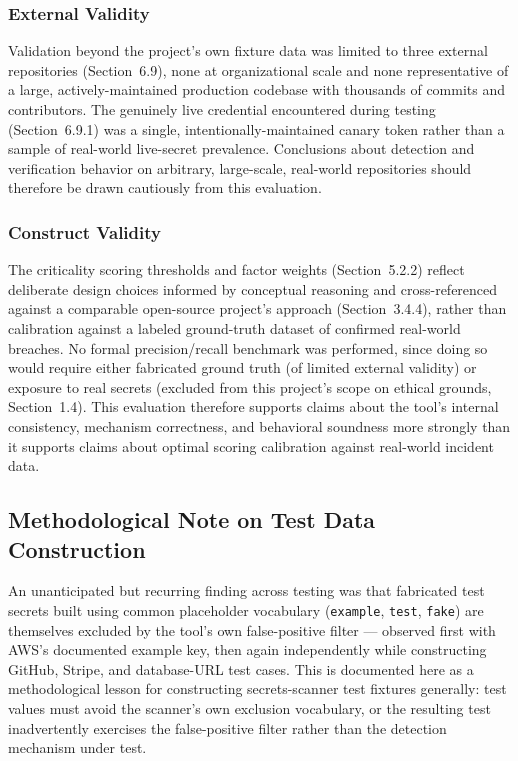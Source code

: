 \documentclass[12pt]{article}
\begin{document}
\subsubsection*{External Validity}

Validation beyond the project's own fixture data was limited to three external repositories (Section~6.9), none at organizational scale and none representative of a large, actively-maintained production codebase with thousands of commits and contributors. The genuinely live credential encountered during testing (Section~6.9.1) was a single, intentionally-maintained canary token rather than a sample of real-world live-secret prevalence. Conclusions about detection and verification behavior on arbitrary, large-scale, real-world repositories should therefore be drawn cautiously from this evaluation.

\subsubsection*{Construct Validity}

The criticality scoring thresholds and factor weights (Section~5.2.2) reflect deliberate design choices informed by conceptual reasoning and cross-referenced against a comparable open-source project's approach (Section~3.4.4), rather than calibration against a labeled ground-truth dataset of confirmed real-world breaches. No formal precision/recall benchmark was performed, since doing so would require either fabricated ground truth (of limited external validity) or exposure to real secrets (excluded from this project's scope on ethical grounds, Section~1.4). This evaluation therefore supports claims about the tool's internal consistency, mechanism correctness, and behavioral soundness more strongly than it supports claims about optimal scoring calibration against real-world incident data.

\subsection{Methodological Note on Test Data Construction}

An unanticipated but recurring finding across testing was that fabricated test secrets built using common placeholder vocabulary (\texttt{example}, \texttt{test}, \texttt{fake}) are themselves excluded by the tool's own false-positive filter --- observed first with AWS's documented example key, then again independently while constructing GitHub, Stripe, and database-URL test cases. This is documented here as a methodological lesson for constructing secrets-scanner test fixtures generally: test values must avoid the scanner's own exclusion vocabulary, or the resulting test inadvertently exercises the false-positive filter rather than the detection mechanism under test.
\end{document}
